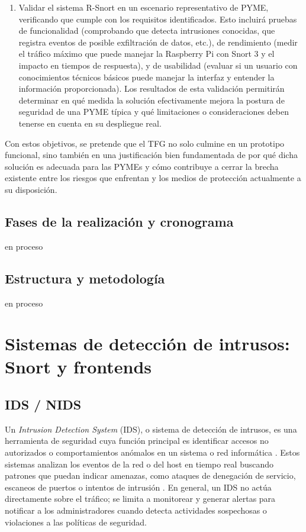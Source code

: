 \documentclass[11pt,a4paper,twoside]{report}
\begin{document}
\begin{enumerate}
	\item Validar el sistema R-Snort en un escenario representativo de PYME, verificando que cumple con los requisitos identificados. Esto incluirá pruebas de funcionalidad (comprobando que detecta intrusiones conocidas, que registra eventos de posible exfiltración de datos, etc.), de rendimiento (medir el tráfico máximo que puede manejar la Raspberry Pi con Snort 3 y el impacto en tiempos de respuesta), y de usabilidad (evaluar si un usuario con conocimientos técnicos básicos puede manejar la interfaz y entender la información proporcionada). Los resultados de esta validación permitirán determinar en qué medida la solución efectivamente mejora la postura de seguridad de una PYME típica y qué limitaciones o consideraciones deben tenerse en cuenta en su despliegue real.
\end{enumerate}

Con estos objetivos, se pretende que el TFG no solo culmine en un prototipo funcional, sino también en una justificación bien fundamentada de por qué dicha solución es adecuada para las PYMEs y cómo contribuye a cerrar la brecha existente entre los riesgos que enfrentan y los medios de protección actualmente a su disposición.


\section{Fases de la realización y cronograma}
en proceso
\section{Estructura y metodología}
en proceso

\setcounter{secnumdepth}{2} 

\cleardoublepage
\thispagestyle{empty}
\chapter{Sistemas de detección de intrusos: Snort y frontends}

\section{IDS / NIDS}

Un \textit{Intrusion Detection System} (IDS), o sistema de detección de intrusos, es una herramienta de seguridad cuya función principal es identificar accesos no autorizados o comportamientos anómalos en un sistema o red informática \cite{wikiNIDS}. Estos sistemas analizan los eventos de la red o del host en tiempo real buscando patrones que puedan indicar amenazas, como ataques de denegación de servicio, escaneos de puertos o intentos de intrusión \cite{NISTSP80094}. En general, un IDS no actúa directamente sobre el tráfico; se limita a monitorear y generar alertas para notificar a los administradores cuando detecta actividades sospechosas o violaciones a las políticas de seguridad.\newline
\end{document}
